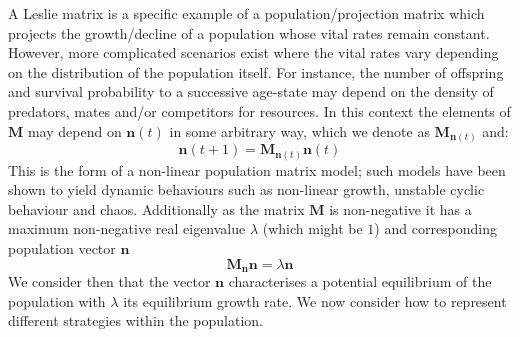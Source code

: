 A Leslie matrix is a specific example of a population/projection matrix which projects the growth/decline of a population whose vital rates remain constant.
However, more complicated scenarios exist where the vital rates vary depending on the distribution of the population itself.
For instance, the number of offspring and survival probability to a successive age-state may depend on the density of predators, mates and/or competitors for resources.
In this context the elements of $\mathbf{M}$ may depend on $\mathbf{n}(t)$ in some arbitrary way, which we denote as $\mathbf{M}_{\mathbf{n}(t)}$ and:
$$\mathbf{n}(t+1) = \mathbf{M}_{\mathbf{n}(t)}\mathbf{n}(t)$$
This is the form of a non-linear population matrix model; such models have been shown to yield dynamic behaviours such as non-linear growth, unstable cyclic behaviour and chaos.
Additionally as the matrix $\mathbf{M}$ is non-negative it has a maximum non-negative real eigenvalue $\lambda$ (which might be $1$) and corresponding population vector $\mathbf{n}$
$$\mathbf{M}_{\mathbf{n}}\mathbf{n} = \lambda\mathbf{n}$$
We consider then that the vector $\mathbf{n}$ characterises a potential equilibrium of the population with $\lambda$ its equilibrium growth rate. We now consider how to represent different strategies within the population.

